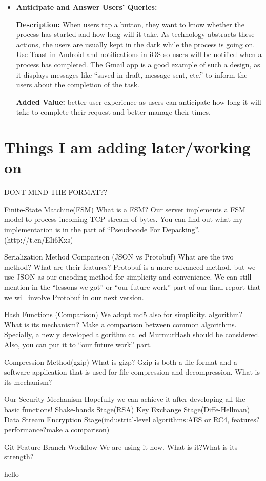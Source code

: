 \documentclass{article}
\begin{document}
\begin{itemize}
\item \textbf{Anticipate and Answer Users’ Queries:}

\textbf{Description:} When users tap a button, they want to know whether the process has started and how long will it take. As technology abstracts these actions, the users are usually kept in the dark while the process is going on. Use Toast in Android and notifications in iOS so users will be notified when a process has completed. The Gmail app is a good example of such a design, as it displays messages like “saved in draft, message sent, etc.” to inform the users about the completion of the task.

\textbf{Added Value:} better user experience as users can anticipate how long it will take to complete their request and better manage their times.
\end{itemize}

\section{Things I am adding later/working on}
DONT MIND THE FORMAT??

Finite-State Matchine(FSM)
What is a FSM?
Our server implements a FSM model to process incoming TCP stream of bytes.
You can find out what my implementation is in the part of “Pseudocode For Depacking”. (http://t.cn/EIi6Kxs)

Serialization Method Comparison (JSON vs Protobuf)
What are the two method?
What are their features?
Protobuf is a more advanced method, but we use JSON as our encoding method for simplicity and convenience. We can still mention in the “lessons we got” or “our future work” part of our final report that we will involve Protobuf in our next version.

Hash Functions (Comparison)
We adopt md5 also for simplicity. algorithm?
What is its mechanism?
Make a comparison between common algorithms. Specially, a newly developed algorithm called MurmurHash should be considered. Also, you can put it to “our future work” part.

Compression Method(gzip)
What is gizp?
Gzip is both a file format and a software application that is used for file compression and decompression.
What is its mechanism?


Our Security Mechanism
Hopefully we can achieve it after developing all the basic functions!
Shake-hands Stage(RSA)
Key Exchange Stage(Diffe-Hellman)
Data Stream Encryption Stage(industrial-level algorithms:AES or RC4, features?performance?make a comparison)

Git Feature Branch Workflow
We are using it now. What is it?What is its strength?

hello
\end{document}
